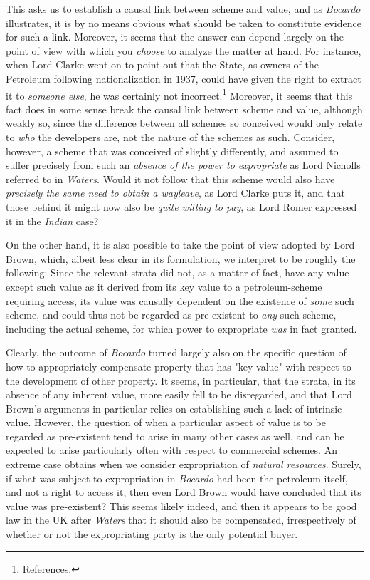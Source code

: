 This asks us to establish a causal link between scheme and value, and as \emph{Bocardo} illustrates, it is by no means obvious what should be taken to constitute evidence for such a link. Moreover, it seems that the answer can depend largely on the point of view with which you \emph{choose} to analyze the matter at hand. For instance, when Lord Clarke went on to point out that the State, as owners of the Petroleum following nationalization in 1937, could have given the right to extract it to \emph{someone else}, he was certainly not incorrect.\footnote{References.} Moreover, it seems that this fact does in some sense break the causal link between scheme and value, although weakly so, since the difference between all schemes so conceived would only relate to \emph{who} the developers are, not the nature of the schemes as such. Consider, however, a scheme that was conceived of slightly differently, and assumed to suffer precisely from such an \emph{absence of the power to expropriate} as Lord Nicholls referred to in \emph{Waters}. Would it not follow that this scheme would also have \emph{precisely the same need to obtain a wayleave}, as Lord Clarke puts it, and that those behind it might now also be \emph{quite willing to pay}, as Lord Romer expressed it in the \emph{Indian} case?

On the other hand, it is also possible to take the point of view adopted by Lord Brown, which, albeit less clear in its formulation, we interpret to be roughly the following: Since the relevant strata did not, as a matter of fact, have any value except such value as it derived from its key value to a petroleum-scheme requiring access, its value was causally dependent on the existence of \emph{some} such scheme, and could thus not be regarded as pre-existent to \emph{any} such scheme, including the actual scheme, for which power to expropriate \emph{was} in fact granted.

Clearly, the outcome of \emph{Bocardo} turned largely also on the specific question of how to appropriately compensate property that has "key value" with respect to the development of other property. It seems, in particular, that the strata, in its absence of any inherent value, more easily fell to be disregarded, and that Lord Brown's arguments in particular relies on establishing such a lack of intrinsic value. However, the question of when a particular aspect of value is to be regarded as pre-existent tend to arise in many other cases as well, and can be expected to arise particularly often with respect to commercial schemes. An extreme case obtains when we consider expropriation of \emph{natural resources}. Surely, if what was subject to expropriation in \emph{Bocardo} had been the petroleum itself, and not a right to access it, then even Lord Brown would have concluded that its value was pre-existent? This seems likely indeed, and then it appears to be good law in the UK after \emph{Waters} that it should also be compensated, irrespectively of whether or not the expropriating party is the only potential buyer.

